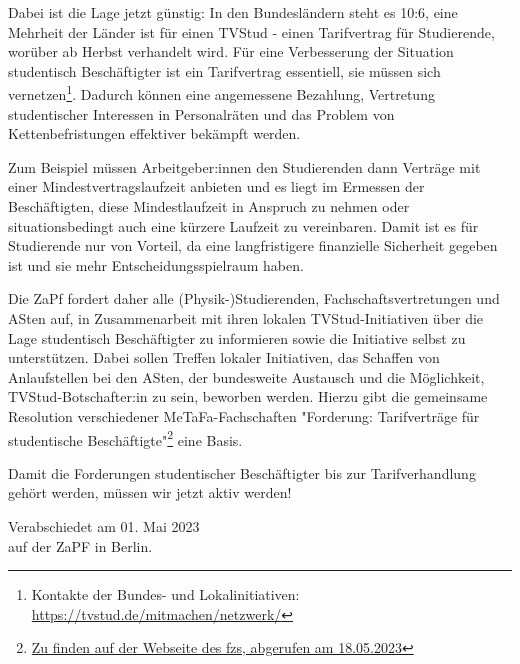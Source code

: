 \documentclass[DIV=calc]{scrartcl}
\begin{document}
Dabei ist die Lage jetzt günstig: In den Bundesländern steht es 10:6, eine Mehrheit der Länder ist für einen TVStud - einen Tarifvertrag für Studierende, worüber ab Herbst verhandelt wird. Für eine Verbesserung der Situation studentisch Beschäftigter ist ein Tarifvertrag essentiell, sie müssen sich vernetzen\footnote{Kontakte der Bundes- und Lokalinitiativen: \url{https://tvstud.de/mitmachen/netzwerk/}}. Dadurch können eine angemessene Bezahlung, Vertretung studentischer Interessen in Personalräten und das Problem von Kettenbefristungen effektiver bekämpft werden.

Zum Beispiel müssen Arbeitgeber:innen den Studierenden dann Verträge mit einer Mindestvertragslaufzeit anbieten und es liegt im Ermessen der Beschäftigten, diese Mindestlaufzeit in Anspruch zu nehmen oder situationsbedingt auch eine kürzere Laufzeit zu vereinbaren. Damit ist es für Studierende nur von Vorteil, da eine langfristigere finanzielle Sicherheit gegeben ist und sie mehr Entscheidungsspielraum haben.

Die ZaPf fordert daher alle (Physik-)Studierenden, Fachschaftsvertretungen und ASten auf, in Zusammenarbeit mit ihren lokalen TVStud-Initiativen über die Lage studentisch Beschäftigter zu informieren sowie die Initiative selbst zu unterstützen. Dabei sollen Treffen lokaler Initiativen, das Schaffen von Anlaufstellen bei den ASten, der bundesweite Austausch und die Möglichkeit, TVStud-Botschafter:in zu sein, beworben werden. Hierzu gibt die gemeinsame Resolution verschiedener MeTaFa-Fachschaften "Forderung: Tarifverträge für studentische Beschäftigte"\footnote{\href{https://www.fzs.de/buendnisse-zusammenarbeit-und-mitgliedschaften/meta-tagung-der-fachschaften-metafa/forderung-tarifvertrag-fuer-studentische-beschaeftigte-tvstud-2/}{Zu finden auf der Webseite des fzs, abgerufen am 18.05.2023}} eine Basis.

Damit die Forderungen studentischer Beschäftigter bis zur Tarifverhandlung gehört werden, müssen wir jetzt aktiv werden!




\vspace{1cm} 

\vfill
\begin{flushright}
	Verabschiedet am 01. Mai 2023 \\
	auf der ZaPF in Berlin.
\end{flushright}
\end{document}
